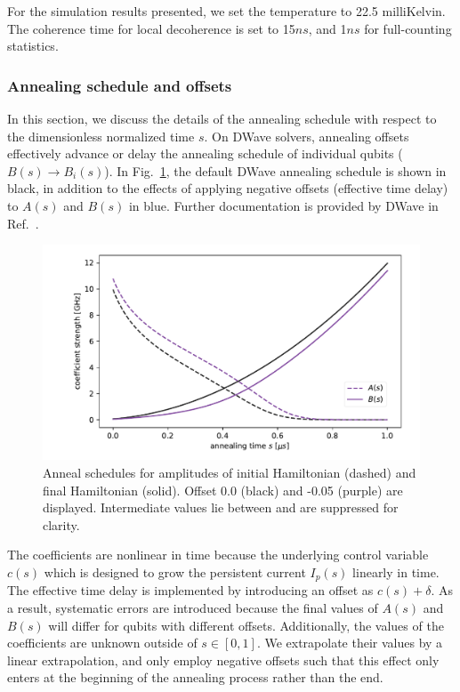 \documentclass[prd,twocolumn,tightenlines,preprintnumbers,showpacs,superscriptaddress,notitlepage,nofootinbib,eqsecnum,floatfix,longbibliography,aps,10pt]{revtex4-2}
\begin{document}
For the simulation results presented, we set the temperature to 22.5 milliKelvin.
The coherence time for local decoherence is set to 15$ns$, and 1$ns$ for full-counting statistics.

\subsubsection{Annealing schedule and offsets}
\label{sec:methods:annealing-schedule}
In this section, we discuss the details of the annealing schedule with respect to the dimensionless normalized time $s$.
On DWave solvers, annealing offsets effectively advance or delay the annealing schedule of individual qubits ($B(s) \to B_i(s)$).
In Fig.~\ref{fig:anneal_schedule}, the default DWave annealing schedule is shown in black, in addition to the effects of applying negative offsets (effective time delay) to $A(s)$ and $B(s)$ in blue.
Further documentation is provided by DWave in Ref.~\cite{dwave_as, dwave_as_docu}.

\begin{figure}[htb]
 \centering
  \includegraphics[width=\columnwidth]{./new_figures/anneal_schedule.pdf}
  \caption{
  Anneal schedules for amplitudes of initial Hamiltonian (dashed) and final Hamiltonian (solid).
  Offset 0.0 (black) and -0.05 (purple) are displayed.
  Intermediate values lie between and are suppressed for clarity.
 }
 \label{fig:anneal_schedule}
\end{figure}

The coefficients are nonlinear in time because the underlying control variable $c(s)$ which is designed to grow the persistent current $I_p(s)$ linearly in time.
The effective time delay is implemented by introducing an offset as $c(s) + \delta$.
As a result, systematic errors are introduced because the final values of $A(s)$ and $B(s)$ will differ for qubits with different offsets.
Additionally, the values of the coefficients are unknown outside of $s\in [0, 1]$.
We extrapolate their values by a linear extrapolation, and only employ negative offsets such that this effect only enters at the beginning of the annealing process rather than the end.
\end{document}
